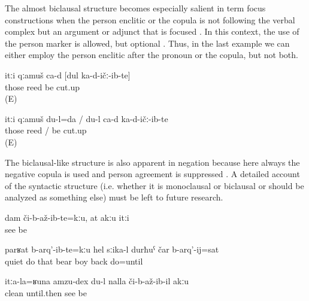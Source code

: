 The almost biclausal structure becomes especially salient in term focus constructions when the person enclitic or the copula is not following the verbal complex but an argument or adjunct that is focused . In this context, the use of the person marker is allowed, but optional . Thus, in the last example we can either employ the person enclitic after the pronoun or the copula, but not both.
%
\begin{exe}
	\ex	\label{ex:It is the reed that I cut analytic}
	\gll	itːi	qːamuš	ca-d	[dul		ka-d-ičː-ib-te]	\\
		those	reed be			cut.up\\
	\glt	{} (E) 

	\ex	\label{ex:It is me who cut the reed analytic}
	\gll	itːi	qːamuš		du-l=da	/ du-l ca-d ka-d-ičː-ib-te	\\
		those	reed		/  be cut.up\\
	\glt	{} (E)
\end{exe}

The biclausal-like structure is also apparent in negation because here always the negative copula  is used and person agreement is suppressed . A detailed account of the syntactic structure (i.e. whether it is monoclausal or biclausal or should be analyzed as something else) must be left to future research.
%
\begin{exe}
	\ex	\label{ex:I did not see them, you also (did not see them)}
	\gll	dam	či-b-až-ib-te=kːu,	at	akːu	itːi\\
			see		 be	\\
	\glt	{}

	\ex	\label{ex:‎The bear was not quiet before they did give it its cub back}
	\gll	parʁat	b-arq'-ib-te=kːu	hel	sːika-l		durħuˁ	čar	b-arq'-ij=sat\\
		quiet	do	that	bear	boy	back	do=until\\
	\glt	{}

	\ex	\label{ex:‎A cleanness like theirs I have seen nowhere analytic}
	\gll	itːa-la=ʁuna	amzu-dex	du-l	nalla	či-b-až-ib-il	akːu\\
			clean		until.then	see	be\\
	\glt	{}
\end{exe}


